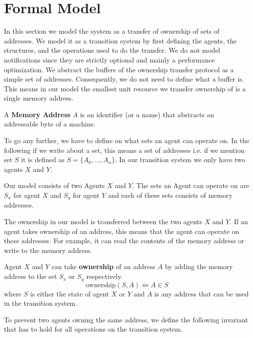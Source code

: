 \documentclass[a4paper,11pt,twoside]{report}
\begin{document}
	\chapter{Formal Model}
	In this section we model the system as a transfer of ownership of sets of addresses. We model it as a 
	transition system by first defining the agents, the structures, 
	and the operations used to do the transfer. We do not model notifications since they are strictly optional
	and mainly a performance optimization. We abstract the buffers 
	of the ownership transfer protocol as a simple set of addresses. Consequently, we do not need to 
	define what a buffer is. This means in our model the smallest unit resource we transfer ownership 
	of is a single memory address. 
	
	\begin{defi}
		A \textbf{Memory Address} \textit{A} is an identifier (or a name) that abstracts 
		an addressable byte of a machine. 
	\end{defi}
	
	To go any further, we have to define on what sets an agent can operate on. In the following
	if we write about a set, this means a set of addresses i.e. if we mention set $S$ it 
	is defined as $S = \{A_0, ..., A_n\}$.
    In our transition system we only have two agents $X$ and $Y$.
	
	\begin{defi}
		Our model consists of two Agents $X$ and $Y$. 
		The sets an Agent can operate on are $S_x$ for agent $X$ and $S_y$ for agent $Y$ and
		each of these sets consists of memory addresses.
	\end{defi}
	
	The ownership in our model is transferred between the two agents $X$ and $Y$. 
	If an agent takes ownership of an address, this means that the agent can operate 
	on these addresses. For example, it can read the 
	contents of the memory address or write to the memory address. 
	
	\begin{defi}[Ownership]	
		Agent $X$ and $Y$ can take \textbf{ownership} of an address $A$ by adding the memory address to the set $S_x$ or $S_y$ respectively.
		\[ \text{ownership}(S, A) \Leftrightarrow A \in S \] 
		where $S$ is either the state of agent $X$ or $Y$ and $A$ is any address that can be used in the transition system. 
	\end{defi}
	
	To prevent two agents owning the same address, we define the following invariant that 
	has to hold for all operations on the transition system.
	
\end{document}

